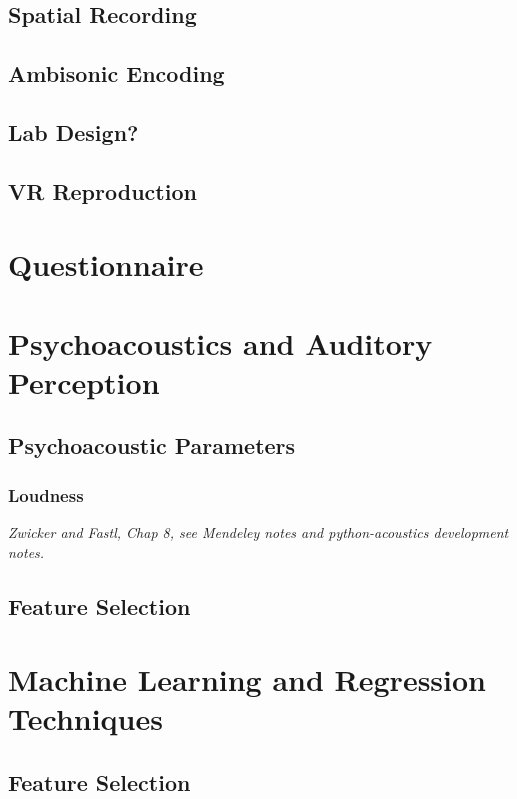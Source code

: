  \subsection{Spatial Recording}

 \subsection{Ambisonic Encoding}

 \subsection{Lab Design?}

 \subsection{VR Reproduction}

\section{Questionnaire}

\section{Psychoacoustics and Auditory Perception}

 \subsection{Psychoacoustic Parameters}

   \subsubsection{Loudness}
     \emph{Zwicker and Fastl, Chap 8, see Mendeley notes and python-acoustics development notes.}
 \subsection{Feature Selection}

\section{Machine Learning and Regression Techniques}

\subsection{Feature Selection}
